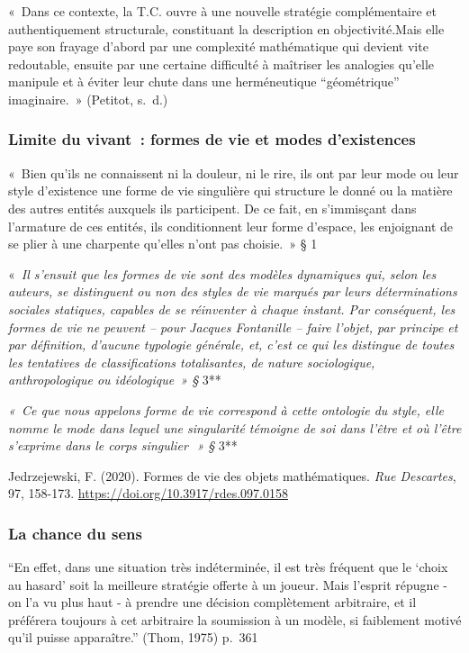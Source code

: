 \documentclass[
  letterpaper,
  DIV=11,
  numbers=noendperiod]{scrreprt}
\begin{document}
«~Dans ce contexte, la T.C. ouvre à une nouvelle stratégie
complémentaire et authentiquement structurale, constituant la
description en objectivité.Mais elle paye son frayage d'abord par une
complexité mathématique qui devient vite redoutable, ensuite par une
certaine difficulté à maîtriser les analogies qu'elle manipule et à
éviter leur chute dans une herméneutique ``géométrique'' imaginaire.~»
(Petitot, s.~d.)

\hypertarget{limite-du-vivant-formes-de-vie-et-modes-dexistences}{%
\subsubsection{Limite du vivant~: formes de vie et modes
d'existences}\label{limite-du-vivant-formes-de-vie-et-modes-dexistences}}

«~Bien qu'ils ne connaissent ni la douleur, ni le rire, ils ont par leur
mode ou leur style d'existence une forme de vie singulière qui structure
le donné ou la matière des autres entités auxquels ils participent. De
ce fait, en s'immisçant dans l'armature de ces entités, ils
conditionnent leur forme d'espace, les enjoignant de se plier à une
charpente qu'elles n'ont pas choisie.~» § 1

«~\emph{Il s'ensuit que les formes de vie sont des modèles dynamiques
qui, selon les auteurs, se distinguent ou non des styles de vie marqués
par leurs déterminations sociales statiques, capables de se réinventer à
chaque instant. Par conséquent, les formes de vie ne peuvent -- pour
Jacques Fontanille -- faire l'objet, par principe et par définition,
d'aucune typologie générale, et, c'est ce qui les distingue de toutes
les tentatives de classifications totalisantes, de nature sociologique,
anthropologique ou idéologique~» §} 3**

\emph{«~Ce que nous appelons forme de vie correspond à cette ontologie
du style, elle nomme le mode dans lequel une singularité témoigne de soi
dans l'être et où l'être s'exprime dans le corps singulier\,~» §} 3**

Jedrzejewski, F. (2020). Formes de vie des objets mathématiques.
\emph{Rue Descartes}, 97, 158-173.
\url{https://doi.org/10.3917/rdes.097.0158}

\hypertarget{la-chance-du-sens}{%
\subsubsection{La chance du sens}\label{la-chance-du-sens}}

``En effet, dans une situation très indéterminée, il est très fréquent
que le `choix au hasard' soit la meilleure stratégie offerte à un
joueur. Mais l'esprit répugne - on l'a vu plus haut - à prendre une
décision complètement arbitraire, et il préférera toujours à cet
arbitraire la soumission à un modèle, si faiblement motivé qu'il puisse
apparaître.'' (Thom, 1975) p.~361
\end{document}
